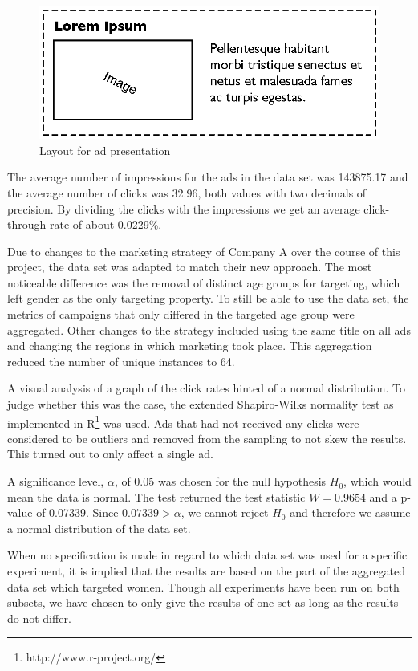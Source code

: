 \documentclass{sig-alternate}
\begin{document}
\begin{figure}[htpb]
	\centering
	\includegraphics[width=\columnwidth]{ad-layout.eps}
	\caption{Layout for ad presentation}
	\label{fig:AdLayout}
\end{figure}

The average number of impressions for the ads in the data set was 143875.17 and the average number of clicks was 32.96, both values with two decimals of precision. By dividing the clicks with the impressions we get an average click-through rate of about 0.0229\%.

Due to changes to the marketing strategy of Company A over the course of this project, the data set was adapted to match their new approach. The most noticeable difference was the removal of distinct age groups for targeting, which left gender as the only targeting property. To still be able to use the data set, the metrics of campaigns that only differed in the targeted age group were aggregated. Other changes to the strategy included using the same title on all ads and changing the regions in which marketing took place. This aggregation reduced the number of unique instances to 64.

A visual analysis of a graph of the click rates hinted of a normal distribution. To judge whether this was the case, the extended Shapiro-Wilks normality test \citep{Royston1982} as implemented in R\footnote{http://www.r-project.org/} was used. Ads that had not received any clicks were considered to be outliers and removed from the sampling to not skew the results. This turned out to only affect a single ad.

A significance level, \(\alpha\), of 0.05 was chosen for the null hypothesis \(H_0\), which would mean the data is normal. The test returned the test statistic \(W = 0.9654\) and a p-value of 0.07339. Since \(0.07339 > \alpha\), we cannot reject \(H_0\) and therefore we assume a normal distribution of the data set.

When no specification is made in regard to which data set was used for a specific experiment, it is implied that the results are based on the part of the aggregated data set which targeted women. Though all experiments have been run on both subsets, we have chosen to only give the results of one set as long as the results do not differ.
\end{document}
